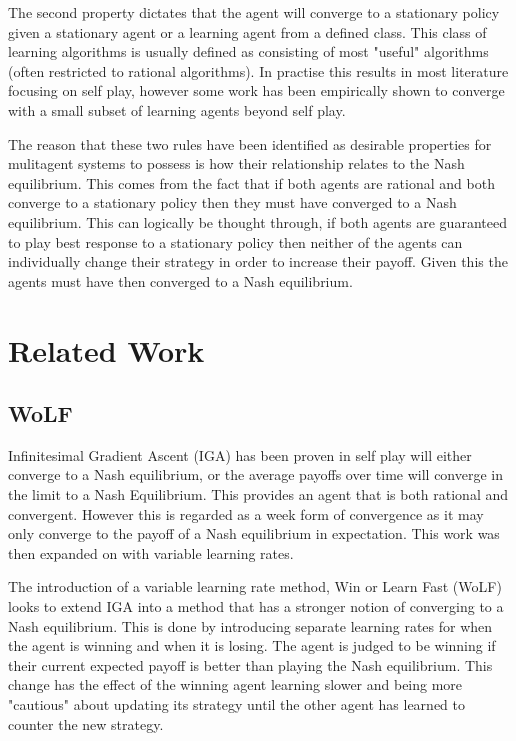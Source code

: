 \documentclass{article}
\begin{document}
The second property dictates that the agent will converge to a stationary policy given 
a stationary agent or a learning agent from a defined class. This class of learning
algorithms is usually defined as consisting of most "useful" algorithms (often restricted
to rational algorithms). In practise this results in most literature focusing on self 
play, however some work has been empirically shown to converge with a small subset of learning 
agents beyond self play. 

The reason that these two rules have been identified as desirable properties for mulitagent
systems to possess is how their relationship relates to the Nash equilibrium. This comes from 
the fact that if both agents are rational and both converge to a stationary policy then they
must have converged to a Nash equilibrium. This can logically be thought through, if both 
agents are guaranteed to play best response to a stationary policy then neither of the agents 
can individually change their strategy in order to increase their payoff. Given this the agents 
must have then converged to a Nash equilibrium.

\section{Related Work}

\subsection{WoLF}

Infinitesimal Gradient Ascent (IGA) has been proven in self play will either converge to a Nash equilibrium,
or the average payoffs over time will converge in the limit to a Nash Equilibrium. This provides an agent
that is both rational and convergent. However this is regarded as a week form of convergence as it may only
converge to the payoff of a Nash equilibrium in expectation. This work was then expanded on with variable
learning rates.

The introduction of a variable learning rate method, Win or Learn Fast (WoLF) looks to extend IGA into a
method that has a stronger notion of converging to a Nash equilibrium. This is done by introducing separate
learning rates for when the agent is winning and when it is losing. The agent is judged to be winning if their
current expected payoff is better than playing the Nash equilibrium. This change has the effect of the winning
agent learning slower and being more "cautious" about updating its strategy until the other agent has learned 
to counter the new strategy.
\end{document}
